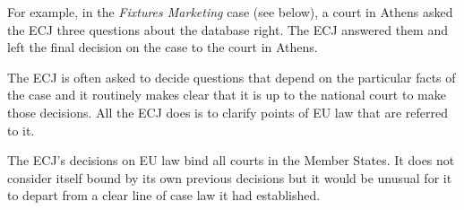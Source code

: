 For example, in the \emph{Fixtures Marketing} case (see below), a court
in Athens asked the ECJ three questions about the database right. The
ECJ answered them and left the final decision on the case to the court
in Athens.

The ECJ is often asked to decide questions that depend on the particular
facts of the case and it routinely makes clear that it is up to the
national court to make those decisions. All the ECJ does is to clarify
points of EU law that are referred to it.

The ECJ's decisions on EU law bind all courts in the Member States. It
does not consider itself bound by its own previous decisions but it
would be unusual for it to depart from a clear line of case law it had
established.
